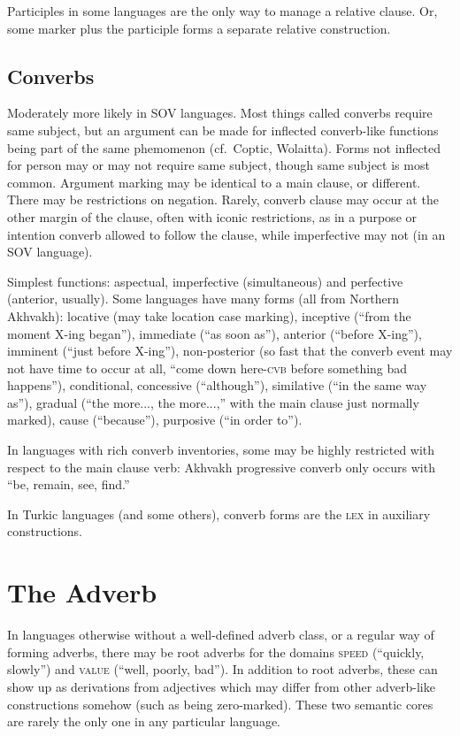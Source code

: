 \documentclass[11pt]{article}
\newcommand{\I}[1]{\textsc{#1}}   %
\begin{document}
{Participles in some languages are the only way to manage a relative
clause.  Or, some marker plus the participle forms a separate relative
construction. 


\subsection{Converbs}
Moderately more likely in SOV languages. Most things called converbs
require same subject, but an argument can be made for inflected
converb-like functions being part of the same phemomenon (cf.\ Coptic,
Wolaitta).  Forms not inflected for person may or may not require same
subject, though same subject is most common.  Argument marking may be
identical to a main clause, or different.  There may be restrictions
on negation.  Rarely, converb clause may occur at the other margin of
the clause, often with iconic restrictions, as in a purpose or
intention converb allowed to follow the clause, while imperfective may
not (in an SOV language).

Simplest functions: aspectual, imperfective (simultaneous) and
perfective (anterior, usually). Some languages have many forms (all
from Northern Akhvakh): locative (may take location case marking),
inceptive (``from the moment X-ing began''), immediate (``as soon
as''), anterior (``before X-ing''), imminent (``just before X-ing''),
non-posterior (so fast that the converb event may not have time to
occur at all, ``come down here-\I{cvb} before something bad
happens''), conditional, concessive (``although''), similative (``in
the same way as''), gradual (``the more..., the more...,'' with the
main clause just normally marked), cause (``because''), purposive
(``in order to'').

In languages with rich converb inventories, some may be highly
restricted with respect to the main clause verb: Akhvakh progressive
converb only occurs with ``be, remain, see, find.''

In Turkic languages (and some others), converb forms are the \I{lex}
in auxiliary constructions.


\section{The Adverb}
In languages otherwise without a well-defined adverb class, or a
regular way of forming adverbs, there may be root adverbs for the
domains \I{speed} (``quickly, slowly'') and \I{value} (``well,
poorly, bad''). In addition to root adverbs, these can show up as
derivations from adjectives which may differ from other adverb-like
constructions somehow (such as being zero-marked). These two semantic
cores are rarely the only one in any particular language.


}
\end{document}

